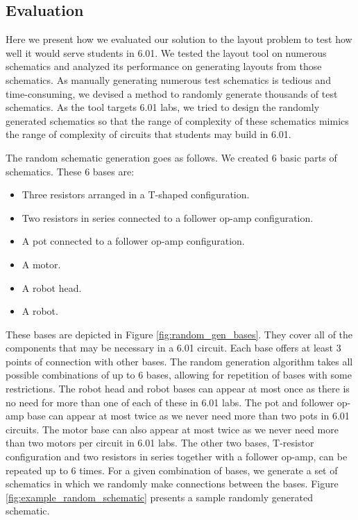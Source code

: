 \subsection{Evaluation}

Here we present how we evaluated our solution to the layout problem
to test how well it would serve students in 6.01.
We tested the layout tool on numerous schematics and
analyzed its performance on generating layouts from those schematics.
As manually generating
numerous test schematics is tedious and time-consuming, we devised a method
to randomly generate thousands of test schematics. As the tool targets 6.01 labs,
we tried to design the randomly generated schematics so that the range of
complexity of these schematics mimics the range of complexity of circuits that
students may build in 6.01.

The random schematic generation goes as follows. We created $6$ basic parts
of schematics. These $6$ bases are:
\begin{itemize}
\item Three resistors arranged in a T-shaped configuration.
\item Two resistors in series connected to a follower op-amp configuration.
\item A pot connected to a follower op-amp configuration.
\item A motor.
\item A robot head.
\item A robot.
\end{itemize}
These bases are depicted in Figure
\ref{fig:random_gen_bases}. They cover all of the components that may be
necessary in a 6.01 circuit. Each base offers at least $3$ points of
connection with other bases. The random generation algorithm takes all
possible combinations of up to
$6$ bases, allowing for repetition of bases with some restrictions.
The robot head and robot bases can appear at most once as there is
no need for more than one of each of these in 6.01 labs. The pot and follower
op-amp base can appear at most twice as we never need more than two pots in 6.01
circuits. The motor base can also appear at most twice as we never need more
than two motors per circuit in 6.01 labs. The other two bases, T-resistor
configuration and two resistors in series together with a follower op-amp, can be
repeated up to 6 times. For a given combination of bases, we generate a
set of schematics in which we randomly make connections between the
bases. Figure \ref{fig:example_random_schematic} presents a sample randomly
generated schematic.

